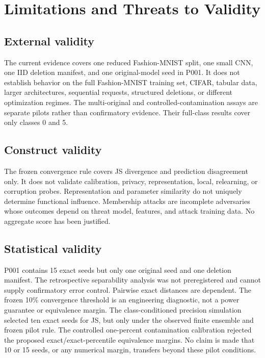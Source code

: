 \section{Limitations and Threats to Validity}
\subsection{External validity}
The current evidence covers one reduced Fashion-MNIST split, one small CNN, one IID
deletion manifest, and one original-model seed in P001. It does not establish behavior on
the full Fashion-MNIST training set, CIFAR, tabular data, larger architectures, sequential
requests, structured deletions, or different optimization regimes. The multi-original
and controlled-contamination assays are separate pilots rather than confirmatory evidence.
Their full-class results cover only classes 0 and 5.

\subsection{Construct validity}
The frozen convergence rule covers JS divergence and prediction disagreement only. It does
not validate calibration, privacy, representation, local, relearning, or corruption probes.
Representation and parameter similarity do not uniquely determine functional influence.
Membership attacks are incomplete adversaries whose outcomes depend on threat model,
features, and attack training data. No aggregate score has been justified.

\subsection{Statistical validity}
P001 contains 15 exact seeds but only one original seed and one deletion manifest. The
retrospective separability analysis was not preregistered and cannot supply confirmatory
error control. Pairwise exact distances are dependent. The frozen 10\% convergence
threshold is an engineering diagnostic, not a power guarantee or equivalence margin.
The class-conditioned precision simulation selected ten exact seeds for JS, but only under
the observed finite ensemble and frozen pilot rule. The controlled one-percent contamination
calibration rejected the proposed exact/exact-percentile equivalence margins. No claim is
made that 10 or 15 seeds, or any numerical margin, transfers beyond these pilot conditions.

